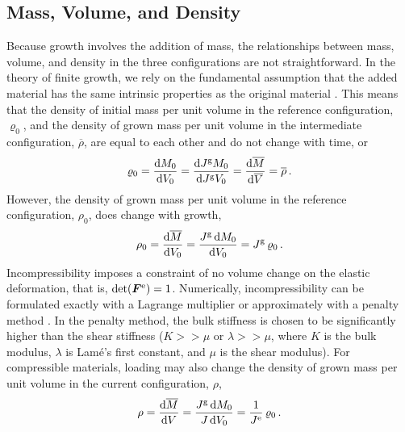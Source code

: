 \documentclass[10pt,letterpaper,oneside]{report}
\newcommand{\sca}[1]{\mbox{\rm{#1}}{}} %
\newcommand{\ten}[1]{\mbox{\boldmath $#1$}{}}
\newcommand{\scas}[1]{\mbox{{\scriptsize{${\rm{#1}}$}}}{}}
\begin{document}
\subsection{Mass, Volume, and Density}
Because growth involves the addition of mass, the relationships between mass, volume, and density in the three configurations are not straightforward.  In the theory of finite growth, we rely on the fundamental assumption that the added material has the same intrinsic properties as the original material \cite{Rodriguez1994}.  This means that 
the density of initial mass per unit volume in the reference configuration, $\varrho_0$, and
the density of grown mass per unit volume in the intermediate configuration, $\overline{\rho}$,
are equal to each other and do not change with time, or  
\begin{equation}
\varrho_0 = \frac{\sca{d} M_0}{\sca{d} V_0} = \frac{\sca{d} J^{\scas{g}} M_0}{\sca{d} J^{\scas{g}} V_0} = \frac{\sca{d} \overline{M}}{\sca{d} \overline{V}} = \overline{\rho} \, .
\end{equation}
However, the density of grown mass per unit volume in the reference configuration, $\rho_0$, does change with growth,
\begin{equation}
\rho_0 = \frac{ \sca{d} \overline{M} }{ \sca{d} V_0 } = \frac{ J^{\scas{g}} \, \sca{d} M_0 }{ \sca{d} V_0 } = J^{\scas{g}} \, \varrho_0 \, .
\end{equation}
Incompressibility imposes a constraint of no volume change on the elastic deformation, that is, $\det (\ten{F}^{\scas{e}}) = 1$.  Numerically, incompressibility can be formulated exactly with a Lagrange multiplier or approximately with a penalty method \cite{Hughes}.  In the penalty method, the bulk stiffness is chosen to be significantly higher than the shear stiffness ($K >> \mu$ or $\lambda >> \mu$, where $K$ is the bulk modulus, $\lambda$ is Lam\'{e}'s first constant, and $\mu$ is the shear modulus).  
For compressible materials, loading may also change the density of grown mass per unit volume in the current configuration, $\rho$,
\begin{equation}
\rho = \frac{ \sca{d} \overline{M} }{ \sca{d} V } = \frac{ J^{\scas{g}} \, \sca{d} M_0 }{ J \, \sca{d} V_0 } = \frac{1}{J^{\scas{e}}} \, \varrho_0 \, .
\end{equation}
\end{document}

